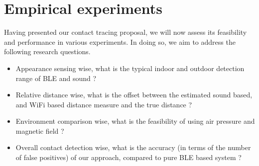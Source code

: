 \documentclass[graybox]{svmult}
\begin{document}
\section{Empirical experiments}
\label{experiments}
Having presented our contact tracing proposal, we will now assess its feasibility and performance in various experiments. In doing so, we aim to address the following research questions.
\begin{itemize}
    \item Appearance sensing wise, what is the typical indoor and outdoor detection range of BLE and sound ?
    
    \item Relative distance wise, what is the offset between the estimated sound based, and WiFi based distance measure and the true distance ?
    
    \item Environment comparison wise, what is the feasibility of using air pressure and magnetic field ?
    
    \item Overall contact detection wise, what is the accuracy (in terms of the number of false positives) of our approach, compared to pure BLE based system ?
\end{itemize}
\end{document}
